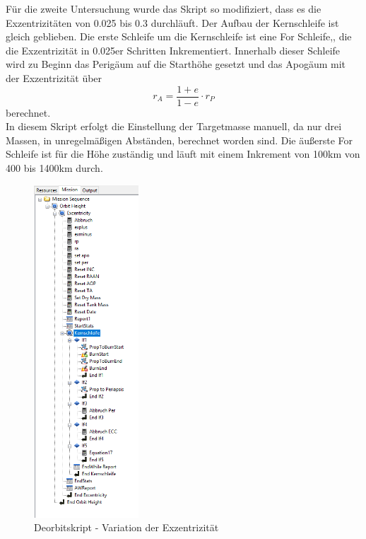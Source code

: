 Für die zweite Untersuchung wurde das Skript so modifiziert, dass es die Exzentrizitäten von 0.025 bis 0.3 durchläuft.
Der Aufbau der Kernschleife ist gleich geblieben. Die erste Schleife um die Kernschleife ist eine For Schleife,, die die Exzentrizität in 0.025er Schritten Inkrementiert. Innerhalb dieser Schleife wird zu Beginn das Perigäum auf die Starthöhe gesetzt und das Apogäum mit der Exzentrizität über
\begin{equation}
r_A = \frac{1+e}{1-e}\cdot r_P
\label{apoapsis}
\end{equation}
berechnet.\\
In diesem Skript erfolgt die Einstellung der Targetmasse manuell, da nur drei Massen, in unregelmäßigen Abständen, berechnet worden sind. Die äußerste For Schleife ist für die Höhe zuständig und läuft mit einem Inkrement von 100km von 400 bis 1400km durch.
\begin{figure}[!h]
	\centering
		\includegraphics[width=0.35\textwidth]{graphics/GMAT/GMAT_Skript_ECC.PNG}
		\caption{Deorbitskript - Variation der Exzentrizität}
			\label{fig:GMAT_Skript_ECC}
\end{figure}



\newpage

